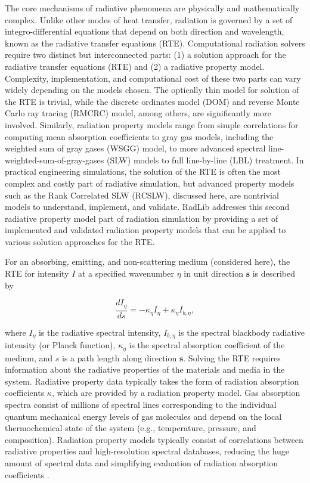 \documentclass[preprint,12pt]{elsarticle}
\newcounter{bla}
\begin{document}
    The core mechanisms of radiative phenomena are physically and mathematically complex. Unlike other modes of heat
    transfer, radiation is governed by a set of integro-differential equations that depend on both direction and
    wavelength, known as the radiative transfer equations (RTE). Computational radiation solvers require two distinct
    but interconnected parts: (1) a solution approach for the radiative transfer equations (RTE) and (2) a radiative
    property model.
    Complexity, implementation, and computational cost of these two parts can vary widely depending on the models
    chosen. The optically thin model for solution of the RTE is trivial, while the discrete ordinates model (DOM) and
    reverse Monte Carlo ray tracing (RMCRC) model, among others, are significantly more involved. Similarly, radiation
    property models range from simple correlations for computing mean absorption coefficients to gray gas models, including the weighted
    sum of gray gases (WSGG) model, to more advanced spectral line-weighted-sum-of-gray-gases (SLW) models to full
    line-by-line (LBL) treatment. In practical engineering simulations, the solution of the RTE is
    often the most complex and costly part of radiative simulation, but advanced property models such as the Rank
    Correlated SLW (RCSLW), discussed here, are nontrivial models to understand, implement, and validate.
    RadLib addresses this second radiative property model part of radiation simulation by providing a set of
    implemented and validated radiation property models that can be applied to various solution approaches for the RTE.

    For an absorbing, emitting, and non-scattering medium (considered here), the RTE for intensity $I$ at a specified wavenumber $\eta$ in unit direction $\mathbf{s}$ is described by
% 
    \begin{linenomath}
        \begin{equation}
            \label{e:RTE_general}
            \frac{dI_{\eta}}{ds} = -\kappa_{\eta}I_{\eta} + \kappa_{\eta}I_{b,\eta},
        \end{equation}
    \end{linenomath}
%
    where $I_{\eta}$ is the radiative spectral intensity, $I_{b,\eta}$ is the spectral blackbody radiative intensity
    (or Planck function), $\kappa_{\eta}$ is the spectral absorption coefficient of the medium, and $s$ is a path length
    along direction $\mathbf{s}$.
    Solving the RTE requires information about the radiative properties of the materials and media in the system.
    Radiative property data typically takes the form of radiation absorption
    coefficients $\kappa$, which are provided by a radiation property model.
    Gas absorption spectra consist of millions of spectral lines corresponding to the individual quantum mechanical
    energy levels of gas molecules and depend
    on the local thermochemical state of the system (e.g., temperature, pressure, and composition).
    Radiation property models typically consist of correlations between radiative properties and high-resolution
    spectral databases, reducing the huge amount of spectral data and
    simplifying evaluation of radiation absorption coefficients \cite{Zhang_2002b}.
\end{document}
